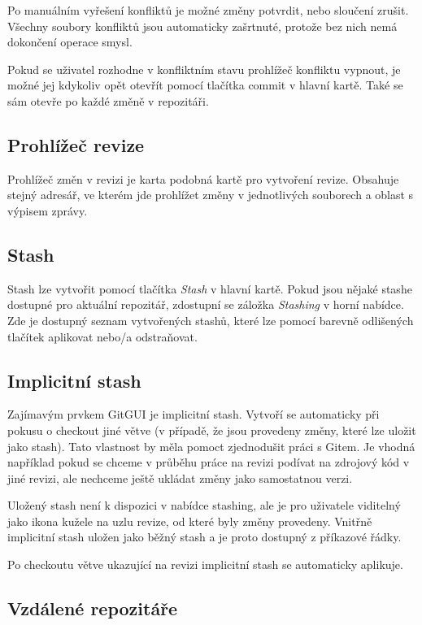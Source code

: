 \documentclass[
  biblatex,
  glossaries,
  index
]{kidiplom}
\begin{document}
Po manuálním vyřešení konfliktů je možné změny potvrdit, nebo sloučení zrušit. Všechny soubory konfliktů jsou automaticky zašrtnuté, protože bez nich nemá dokončení operace smysl.

Pokud se uživatel rozhodne v konfliktním stavu prohlížeč konfliktu vypnout, je možné jej kdykoliv opět otevřít pomocí tlačítka commit v hlavní kartě. Také se sám otevře po každé změně v repozitáři.

\subsection{Prohlížeč revize}
Prohlížeč změn v revizi je karta podobná kartě pro vytvoření revize. Obsahuje stejný adresář, ve kterém jde prohlížet změny v jednotlivých souborech a oblast s výpisem zprávy.

\subsection{Stash}
Stash lze vytvořit pomocí tlačítka {\it Stash} v hlavní kartě. Pokud jsou nějaké stashe dostupné pro aktuální repozitář, zdostupní se záložka {\it Stashing} v horní nabídce. Zde je dostupný seznam vytvořených stashů, které lze pomocí barevně odlišených tlačítek aplikovat nebo/a odstraňovat.

\subsection{Implicitní stash}
Zajímavým prvkem GitGUI je implicitní stash. Vytvoří se automaticky při pokusu o checkout jiné větve (v případě, že jsou provedeny změny, které lze uložit jako stash). Tato vlastnost by měla pomoct zjednodušit práci s Gitem. Je vhodná například pokud se chceme v průběhu práce na revizi podívat na zdrojový kód v jiné revizi, ale nechceme ještě ukládat změny jako samostatnou verzi.

Uložený stash není k dispozici v nabídce stashing, ale je pro uživatele viditelný jako ikona kužele na uzlu revize, od které byly změny provedeny. Vnitřně implicitní stash uložen jako běžný stash a je proto dostupný z příkazové řádky.

Po checkoutu větve ukazující na revizi  implicitní stash se automaticky aplikuje.

\subsection{Vzdálené repozitáře}
\end{document}
